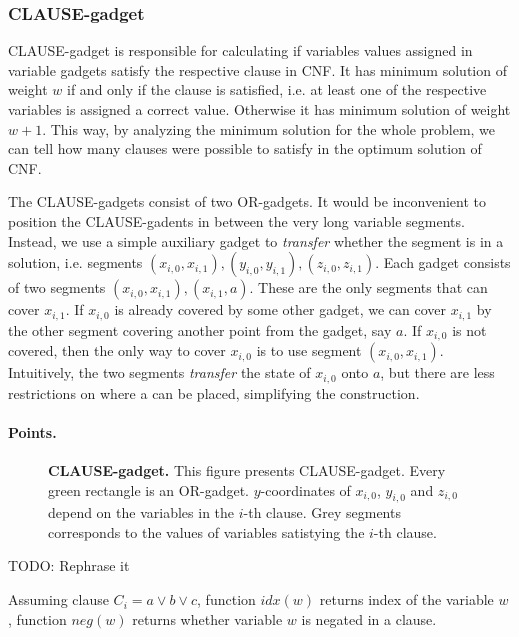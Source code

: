 \subsubsection{CLAUSE-gadget}


CLAUSE-gadget is responsible for calculating if
variables values assigned in variable gadgets
satisfy the respective clause in CNF.
It has minimum solution of weight $w$
if and only if the clause is satisfied, i.e. at least one
of the respective variables is assigned a correct value.
Otherwise it has minimum solution of weight $w+1$.
This way, by analyzing the minimum solution for the whole problem,
we can tell how many clauses were possible to satisfy
in the optimum solution of CNF.

The CLAUSE-gadgets consist of two OR-gadgets.
It would be inconvenient to position the CLAUSE-gadents
in between the very long variable segments.
Instead, we use a simple auxiliary gadget to
\textit{transfer} whether the segment
is in a solution, i.e. segments
$(x_{i, 0}, x_{i, 1}), (y_{i, 0}, y_{i, 1}), (z_{i, 0}, z_{i, 1})$.
Each gadget consists of two segments $(x_{i, 0}, x_{i, 1}), (x_{i, 1}, a)$.
These are the only segments that can cover $x_{i,1}$.
If $x_{i,0}$ is already covered by some other gadget,
we can cover $x_{i,1}$ by the other segment covering another point
from the gadget, say $a$.
If $x_{i,0}$ is not covered, then the only way to cover $x_{i,0}$
is to use segment $(x_{i, 0}, x_{i, 1})$.
Intuitively, the two segments \textit{transfer} the state of $x_{i,0}$
onto $a$, but there are less restrictions on where a can be placed,
simplifying the construction.

\paragraph{Points.}

\newcommand{\pointsClause}{\mathsf{pointsClause}}

\begin{figure}[h]
\centering
\def\svgwidth{0.8\columnwidth}

\caption{\textbf{CLAUSE-gadget.}
This figure presents CLAUSE-gadget.
Every green rectangle is an OR-gadget.
$y$-coordinates of $x_{i, 0}$, $y_{i, 0}$ and $z_{i,0}$
depend on the variables in the $i$-th clause.
Grey segments corresponds to the values of variables
satistying the $i$-th clause.
}
\label{fig:apx_clause}
\end{figure}

TODO: Rephrase it

Assuming clause $C_i = a \lor b \lor c$,
function $idx(w)$ returns index of the variable $w$,
function $neg(w)$ returns whether variable $w$ is negated
in a clause.

